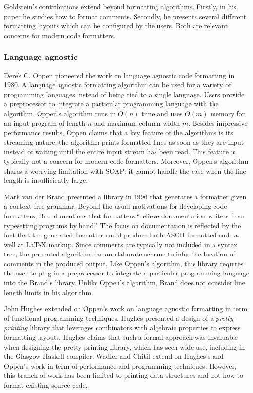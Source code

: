 Goldstein's contributions extend beyond formatting algorithms.
Firstly, in his paper he studies how to format comments.
Secondly, he presents several different formatting layouts which can be configured by the users.
Both are relevant concerns for modern code formatters.

\subsubsection{Language agnostic}\label{sec:agnostic}
Derek C. Oppen pioneered the work on language agnostic code formatting in 1980\autocite{oppen_prettyprinting_1980}.
A language agnostic formatting algorithm can be used for a variety of programming languages instead of being
tied to a single language.
Users provide a preprocessor to integrate a particular programming language with the algorithm.
Oppen's algorithm runs in $O(n)$ time and uses $O(m)$ memory for an input program of length $n$ and maximum column width $m$.
Besides impressive performance results, Oppen claims that a key feature of the algorithms is its streaming nature; the algorithm prints formatted lines as soon as they are input instead of waiting until the entire input stream has been read.
This feature is typically not a concern for modern code formatters.
Moreover, Oppen's algorithm shares a worrying limitation with SOAP: it cannot handle the case when the line length is insufficiently large.

Mark van der Brand presented a library in 1996 that generates a formatter given a context-free grammar\autocite{van_den_brand_generation_1996}.
Beyond the usual motivations for developing code formatters, Brand mentions that formatters ``relieve documentation writers from typesetting programs by hand''.
The focus on documentation is reflected by the fact that the generated formatter could produce both ASCII formatted code as well at \LaTeX{} markup.
Since comments are typically not included in a syntax tree, the presented algorithm has an elaborate scheme to infer the location of comments in the produced output.
Like Oppen's algorithm, this library requires the user to plug in a preprocessor to integrate a particular programming language into the Brand's library.
Unlike Oppen's algorithm, Brand does not consider line length limits in his algorithm.

John Hughes extended on Oppen's work on language agnostic formatting in term of functional programming techniques\autocite{hughes_design_1995}.
Hughes presented a design of a \emph{pretty-printing} library that leverages combinators with algebraic properties to express formatting layouts.
Hughes claims that such a formal approach was invaluable when designing the pretty-printing library, which has seen wide use, including in the Glasgow Haskell compiler.
Wadler\autocite{wadler_prettier_2003} and Chitil\autocite{swierstra_linear_2009} extend on Hughes's and Oppen's work in term of performance and programming techniques.
However, this branch of work has been limited to printing data structures and not how to format existing source code.


